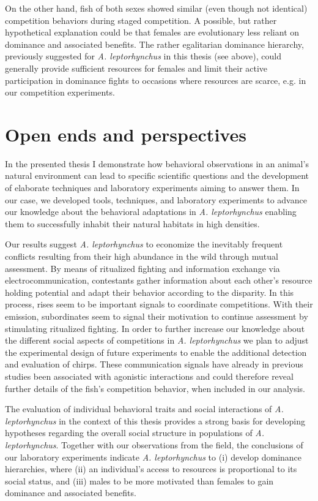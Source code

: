 \documentclass[11pt,pdftex]{article}
\newcommand{\lepto}{\textit{A. leptorhynchus}}
\begin{document}
On the other hand, fish of both sexes showed similar (even though not identical) competition behaviors during staged competition. A possible, but rather hypothetical explanation could be that females are evolutionary less reliant on dominance and associated benefits. The rather egalitarian dominance hierarchy, previously suggested for \lepto{} in this thesis (see above), could generally provide sufficient resources for females and limit their active participation in dominance fights to occasions where resources are scarce, e.g. in our competition experiments.

\section{Open ends and perspectives}

In the presented thesis I demonstrate how behavioral observations in an animal's natural environment can lead to specific scientific questions and the development of elaborate techniques and laboratory experiments aiming to answer them. In our case, we developed tools, techniques, and laboratory experiments to advance our knowledge about the behavioral adaptations in \lepto{} enabling them to successfully inhabit their natural habitats in high densities.

Our results suggest \lepto{} to economize the inevitably frequent conflicts resulting from their high abundance in the wild through mutual assessment. By means of ritualized fighting and information exchange via electrocommunication, contestants gather information about each other's resource holding potential and adapt their behavior according to the disparity. In this process, rises seem to be important signals to coordinate competitions. With their emission, subordinates seem to signal their motivation to continue assessment by stimulating ritualized fighting. In order to further increase our knowledge about the different social aspects of competitions in \lepto{} we plan to adjust the experimental design of future experiments to enable the additional detection and evaluation of chirps. These communication signals have already in previous studies been associated with agonistic interactions and could therefore reveal further details of the fish's competition behavior, when included in our analysis. 

The evaluation of individual behavioral traits and social interactions of \lepto{} in the context of this thesis provides a strong basis for developing hypotheses regarding the overall social structure in populations of \lepto{}. Together with our observations from the field, the conclusions of our laboratory experiments indicate \lepto{} to (i) develop dominance hierarchies, where (ii) an individual's access to resources is proportional to its social status, and (iii) males to be more motivated than females to gain dominance and associated benefits.
\end{document}
